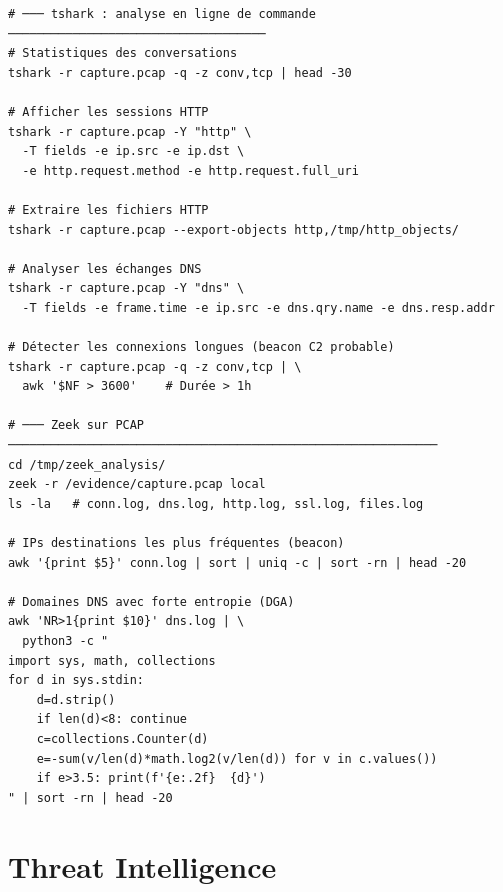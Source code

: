 \begin{lstlisting}[style=StyleTerminal,
  caption={Commandes essentielles: Wireshark / tshark},
  label={lst:tools-wireshark}]
# ─── tshark : analyse en ligne de commande ────────────────────────────────────
# Statistiques des conversations
tshark -r capture.pcap -q -z conv,tcp | head -30

# Afficher les sessions HTTP
tshark -r capture.pcap -Y "http" \
  -T fields -e ip.src -e ip.dst \
  -e http.request.method -e http.request.full_uri

# Extraire les fichiers HTTP
tshark -r capture.pcap --export-objects http,/tmp/http_objects/

# Analyser les échanges DNS
tshark -r capture.pcap -Y "dns" \
  -T fields -e frame.time -e ip.src -e dns.qry.name -e dns.resp.addr

# Détecter les connexions longues (beacon C2 probable)
tshark -r capture.pcap -q -z conv,tcp | \
  awk '$NF > 3600'    # Durée > 1h

# ─── Zeek sur PCAP ────────────────────────────────────────────────────────────
cd /tmp/zeek_analysis/
zeek -r /evidence/capture.pcap local
ls -la   # conn.log, dns.log, http.log, ssl.log, files.log

# IPs destinations les plus fréquentes (beacon)
awk '{print $5}' conn.log | sort | uniq -c | sort -rn | head -20

# Domaines DNS avec forte entropie (DGA)
awk 'NR>1{print $10}' dns.log | \
  python3 -c "
import sys, math, collections
for d in sys.stdin:
    d=d.strip()
    if len(d)<8: continue
    c=collections.Counter(d)
    e=-sum(v/len(d)*math.log2(v/len(d)) for v in c.values())
    if e>3.5: print(f'{e:.2f}  {d}')
" | sort -rn | head -20
\end{lstlisting}

\section{Threat Intelligence}
\label{ann:tools-cti}

